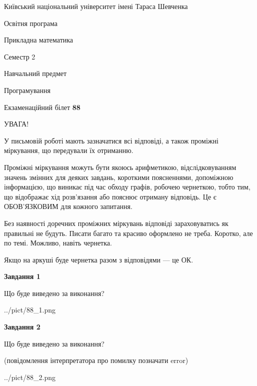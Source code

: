 \documentclass[12pt, ukrainian]{article}
\begin{document}
{{\begin {small}\par
{ \center  Київський національний університет імені Тараса Шевченка \par}
{\parbox {5 cm}{Освітня програма \hfill}{\parbox {7 cm}{Прикладна математика\hfill}}\parbox {6 cm}{\hfill Семестр 2}}\par
{\parbox {5 cm} {Навчальний предмет \hfill}\parbox {7 cm}{Програмування \hfill}\parbox {6cm}{\hfill}\par}\vspace{-7pt} \end{small}}{\center Екзаменаційний білет \No \textbf
{ 88 }\par}}
{
\begin {large}
УВАГА!

У письмовій роботі мають зазначатися всі відповіді, а також проміжні міркування, що передували їх отриманню.

Проміжні міркування можуть бути якоюсь арифметикою, відслідковуванням зна\-чень змінних для деяких завдань,
короткими поясненнями, допоміжною інформацією, що виникає під час обходу графів, робочею чернеткою,
тобто тим, що відображає хід розв’язання або пояснює отриману відповідь.
Це є ОБОВ’ЯЗКОВИМ для кожного запитання.

Без наявності доречних проміжних міркувань відповіді зараховуватись як правиль\-ні не будуть.
Писати багато та красиво оформлено не треба. Коротко, але по темі. Можли\-во, навіть чернетка.

Якщо на аркуші буде чернетка разом з відповідями --- це ОК.

\newpage

{\begin {center}\textbf{Завдання 1}\end {center}}\par
Що буде виведено за виконання?\par
\begin{center}
	{../pict/88_1.png}
\end{center}
\newpage

{\begin {center}\textbf{Завдання 2}\end {center}}\par
Що буде виведено за виконання?\par
 (повідомлення інтерпретатора про помилку позначати error)\par
\begin{center}
	{../pict/88_2.png}
\end{center}
\newpage


\end{large}}
\end{document}
